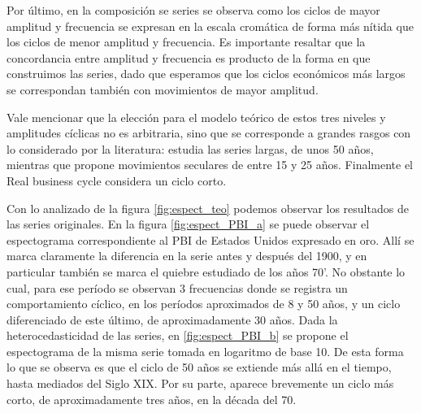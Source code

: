 \documentclass[a4paper]{article}
\begin{document}
Por último, en la composición se series se observa como los ciclos de mayor amplitud y frecuencia se expresan en la escala cromática de forma más nítida que los ciclos de menor amplitud y frecuencia. Es importante resaltar que la concordancia entre amplitud y frecuencia es producto de la forma en que construimos las series, dado que esperamos que los ciclos económicos más largos se correspondan también con movimientos de mayor amplitud.

Vale mencionar que la elección para el modelo teórico de estos tres niveles y amplitudes cíclicas no es arbitraria, sino que se corresponde a grandes rasgos con lo considerado por la literatura: \cite{kondratieff1979long} estudia las series largas, de unos 50 años, mientras que \cite{kuznets1930secular} propone movimientos seculares de entre 15 y 25 años. Finalmente el Real business cycle \citep{kydland1982time} considera un ciclo corto.



Con lo analizado de la figura \ref{fig:espect_teo} podemos observar los resultados de las series originales. En la figura \ref{fig:espect_PBI_a} se puede observar el espectograma correspondiente al PBI de Estados Unidos expresado en oro. Allí se marca claramente la diferencia en la serie antes y después del 1900, y en particular también se marca el quiebre estudiado de los años 70'. No obstante lo cual, para ese período se observan 3 frecuencias donde se registra un comportamiento cíclico, en los períodos aproximados de 8 y 50 años, y un ciclo diferenciado de este último, de aproximadamente 30 años. Dada la heterocedasticidad de las series, en \ref{fig:espect_PBI_b} se propone el espectograma de la misma serie tomada en logaritmo de base 10. De esta forma lo que se observa es que el ciclo de 50 años se extiende más allá en el tiempo, hasta mediados del Siglo XIX. Por su parte, aparece brevemente un ciclo más corto, de aproximadamente tres años, en la década del 70.
\end{document}

